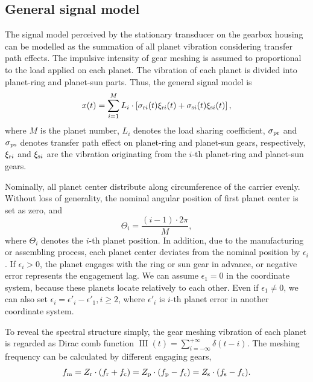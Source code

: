 \documentclass[a4paper,fleqn]{cas-sc}%
\begin{document}
\subsection{General signal model}
\par The signal model perceived by the stationary transducer on the gearbox housing can be modelled as the summation of all planet vibration considering transfer path effects. The impulsive intensity of gear meshing is assumed to proportional to the load applied on each planet. The vibration of each planet is divided into planet-ring and planet-sun parts. Thus, the general signal model is
\begin{equation}
    x(t)=\sum_{i=1}^{M} L_i \cdot \left[ \sigma_{{\rm r}i}(t) \xi_{{\rm r}i}(t) + \sigma_{{\rm s}i}(t) \xi_{{\rm s}i}(t) \right], \label{eq:general_signal}
\end{equation}
where $M$ is the planet number, $L_i$ denotes the load sharing coefficient, $\sigma_{\rm pr}$ and $\sigma_{\rm ps}$ denotes transfer path effect on planet-ring and planet-sun gears, respectively, $\xi_{{\rm r}i}$ and $\xi_{{\rm s}i}$ are the vibration originating from the $i$-th planet-ring and planet-sun gears.
\par Nominally, all planet center distribute along circumference of the carrier evenly. Without loss of generality, the nominal angular position of first planet center is set as zero, and
\begin{equation}
    \Theta_i=\frac{(i-1)\cdot 2\pi}{M},
\end{equation}
where $\Theta_i$ denotes the $i$-th planet position. In addition, due to the manufacturing or assembling process, each planet center deviates from the nominal position by $\epsilon_i$. If $\epsilon_i>0$, the planet engages with the ring or sun gear in advance, or negative error represents the engagement lag. We can assume $\epsilon_1=0$ in the coordinate system, because these planets locate relatively to each other. Even if $\epsilon_1 \neq 0$, we can also set $\epsilon_i=\epsilon'_i-\epsilon'_1,i \geq 2$, where $\epsilon'_i$ is $i$-th planet error in another coordinate system.
\par To reveal the spectral structure simply, the gear meshing vibration of each planet is regarded as Dirac comb function $\operatorname{III}(t)=\sum_{i=-\infty}^{+\infty}\delta(t-i)$. The meshing frequency can be calculated by different engaging gears,
\begin{equation}
    f_{\rm m}=Z_{\rm r} \cdot (f_{\rm r}+f_{\rm c})=Z_{\rm p} \cdot (f_{\rm p}-f_{\rm c})=Z_{\rm s} \cdot (f_{\rm s}-f_{\rm c}). \label{eq:meshing_frequency}
\end{equation}
\end{document}
